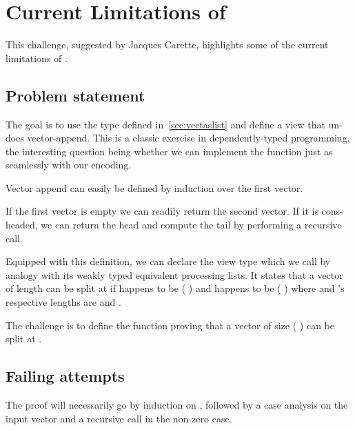 \section{Current Limitations of \idris{}}\label{appendix:limitations}

This challenge, suggested by Jacques Carette, highlights some of the current
limitations of \idris{}.

\subsection{Problem statement}

The goal is to use the  type defined in~\cref{sec:vectaslist}
and define a view that un-does vector-append.
%
This is a classic exercise in dependently-typed programming, the interesting
question being whether we can implement the function just as seamlessly with
our encoding.

Vector append can easily be defined by induction over the first vector.


If the first vector is empty we can readily return the second vector.
%
If it is cons-headed, we can return the head and compute the tail by performing
a recursive call.

Equipped with this definition, we can declare the view type which we call
 by analogy with its weakly typed equivalent processing
lists.
%
It states that a vector  of length  can be split
at  if
 happens to be
( \IdrisFunction{+} )
and  happens to be
( \IdrisFunction{++} )
where  and 's
respective lengths are  and .


The challenge is to define the function proving that a vector of size
( \IdrisFunction{+} ) can be split at
.

\subsection{Failing attempts}

The proof will necessarily go by induction on , followed by
a case analysis on the input vector and a recursive call in the non-zero
case.


